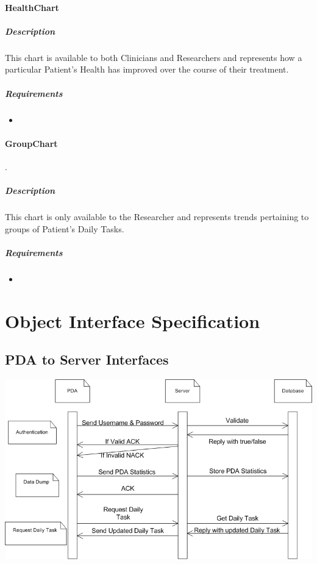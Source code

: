\documentclass{article}
\begin{document}
\paragraph{HealthChart}
\subparagraph{Description}
This chart is available to both Clinicians and Researchers and represents how a particular Patient's Health has improved over the course of their treatment.
\subparagraph{Requirements}
\begin{itemize}
\item {}
\end{itemize}
\paragraph{GroupChart}.
\subparagraph{Description}
This chart is only available to the Researcher and represents trends pertaining to groups of Patient's Daily Tasks. 
\subparagraph{Requirements}
\begin{itemize}
\item {}
\end{itemize}


\section{Object Interface Specification}

\subsection{PDA to Server Interfaces}
\begin{center}
\includegraphics{PDA_to_Server_Interface_Diagram.png}
\end{center}
\end{document}
